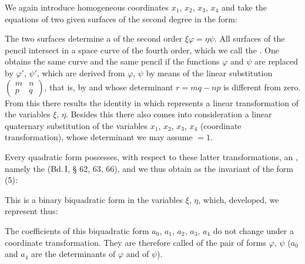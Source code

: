 We again introduce homogeneous coordinates $x_1$, $x_2$, $x_3$, $x_4$ and
take the equations of two given surfaces of the second degree in
the form:

The two surfaces determine a  of the second
order $\xi\varphi=\eta\psi$. All surfaces of the pencil intersect in a space
curve of the fourth order, which we call the .
One obtains the same curve and the same pencil if the functions
$\varphi$ and $\psi$ are replaced by $\varphi'$, $\psi'$, which are derived from $\varphi$, $\psi$
by means of the linear substitution $\begin{pmatrix} m & n \\ p & q \end{pmatrix}$, that is, by
and whose determinant $r=mq-np$ is different from zero. From
this there results the identity
in which
represents a linear transformation of the variables $\xi$, $\eta$. Besides
this  there also comes into consideration a linear quaternary substitution of the variables $x_1$, $x_2$, $x_3$, $x_4$ (coordinate transformation), whose determinant we may assume $=1$.

Every quadratic form possesses, with respect to these latter transformations, an , namely the  (Bd.\,I, § 62, 63, 66), and we thus obtain as the
invariant of the form (5):

This is a binary biquadratic form in the variables $\xi$, $\eta$,
which, developed, we represent thus:

The coefficients of this biquadratic form $a_0$, $a_1$, $a_2$, $a_3$, $a_4$
do not change under a coordinate transformation. They are
therefore called  of the pair of forms $\varphi$, $\psi$ ($a_0$ and
$a_4$ are the determinants of $\varphi$ and of $\psi$).
